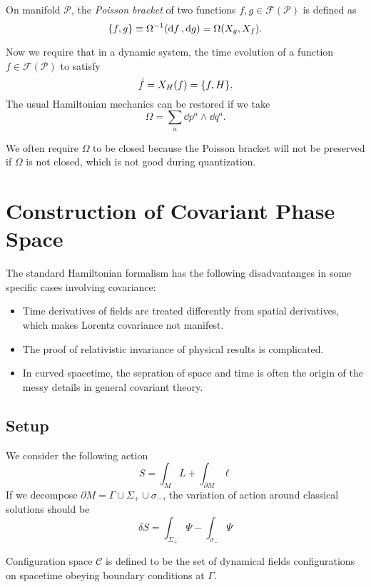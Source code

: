 \documentclass[10pt]{article}
\begin{document}
\begin{definition}
    On manifold $\mathcal{P}$, the \textit{Poisson bracket} of two functions  $f,g\in\mathcal{F}(\mathcal{P})$ is defined as
    \begin{equation}
        \pb{f}{g}\equiv\Omega^{-1}(\dd{f},\dd{g})=\Omega(X_g,X_f).
    \end{equation}
\end{definition}
Now we require that in a dynamic system, the time evolution of a function $f\in\mathcal{F}(\mathcal{P})$ to satisfy
\begin{equation}
    \dot{f}=X_H(f)=\pb{f}{H}.
\end{equation}
The usual Hamiltonian mechanics can be restored if we take
\begin{equation}
    \Omega=\sum_a \dd{p}^a\wedge \dd{q}^a.
\end{equation}
\begin{remark}
    We often require $\Omega$ to be closed because the Poisson bracket will not be preserved if $\Omega$ is not closed, which is not good during quantization.
\end{remark}

\section{Construction of Covariant Phase Space}
The standard Hamiltonian formalism has the following disadvantanges in some specific cases involving covariance\cite{Gieres:2021ekc}:
\begin{itemize}
    \item Time derivatives of fields are treated differently from spatial derivatives, which makes Lorentz covariance not manifest.
    \item The proof of relativistic invariance of physical results is complicated.
    \item In curved spacetime, the sepration of space and time is often the origin of the messy details in general covariant theory.
\end{itemize}

\subsection{Setup}
We consider the following action
\begin{equation}
    S=\int_M L+\int_{\partial M}\ell\label{eq:action}
\end{equation}
If we decompose $\partial M=\Gamma\cup\Sigma_+\cup\sigma_-$, the variation of action around classical solutions should be
\begin{equation}
    \delta S=\int_{\Sigma_+}\Psi-\int_{\sigma_-}\Psi\label{var_S_1}
\end{equation}
\begin{definition}
    Configuration space $\mathcal{C}$ is defined to be the set of dynamical fields configurations on spacetime obeying boundary conditions at $\Gamma$.
\end{definition}
\end{document}
